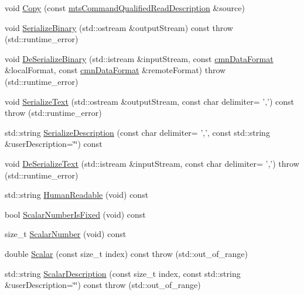 \begin{DoxyCompactItemize}
\item 
void \hyperlink{classmts_command_qualified_read_description_ad4813008aa25d86b8ef7a8356855de6a}{Copy} (const \hyperlink{classmts_command_qualified_read_description}{mts\-Command\-Qualified\-Read\-Description} \&source)
\item 
void \hyperlink{classmts_command_qualified_read_description_a1ac3ea15ff829214a4574777a5d6b5e7}{Serialize\-Binary} (std\-::ostream \&output\-Stream) const   throw (std\-::runtime\-\_\-error)
\item 
void \hyperlink{classmts_command_qualified_read_description_a0e980bbf3eb9dfd2b6d70641247a9cd2}{De\-Serialize\-Binary} (std\-::istream \&input\-Stream, const \hyperlink{classcmn_data_format}{cmn\-Data\-Format} \&local\-Format, const \hyperlink{classcmn_data_format}{cmn\-Data\-Format} \&remote\-Format)  throw (std\-::runtime\-\_\-error)
\item 
void \hyperlink{classmts_command_qualified_read_description_a722d5af1bfa92ed45e5c40e58d84ba0f}{Serialize\-Text} (std\-::ostream \&output\-Stream, const char delimiter= ',') const   throw (std\-::runtime\-\_\-error)
\item 
std\-::string \hyperlink{classmts_command_qualified_read_description_aa976e69bfc37a8c8eeaad129b6ef8e81}{Serialize\-Description} (const char delimiter= ',', const std\-::string \&user\-Description=\char`\"{}\char`\"{}) const 
\item 
void \hyperlink{classmts_command_qualified_read_description_a8d05bf0b2b243f064448632720017a0a}{De\-Serialize\-Text} (std\-::istream \&input\-Stream, const char delimiter= ',')  throw (std\-::runtime\-\_\-error)
\item 
std\-::string \hyperlink{classmts_command_qualified_read_description_a935c688d1dbdd459e8bdba27790cd56b}{Human\-Readable} (void) const 
\item 
bool \hyperlink{classmts_command_qualified_read_description_a167e9db3f2c6251c99aa9f250c3529ed}{Scalar\-Number\-Is\-Fixed} (void) const 
\item 
size\-\_\-t \hyperlink{classmts_command_qualified_read_description_a16ecbbdfe1dacba9d2feccfc9c890439}{Scalar\-Number} (void) const 
\item 
double \hyperlink{classmts_command_qualified_read_description_ac9d25daa0ad5d5681c1128cba7bd4b7f}{Scalar} (const size\-\_\-t index) const   throw (std\-::out\-\_\-of\-\_\-range)
\item 
std\-::string \hyperlink{classmts_command_qualified_read_description_a22b8e1b2efb943978caedc32fabc435b}{Scalar\-Description} (const size\-\_\-t index, const std\-::string \&user\-Description=\char`\"{}\char`\"{}) const   throw (std\-::out\-\_\-of\-\_\-range)
\end{DoxyCompactItemize}
